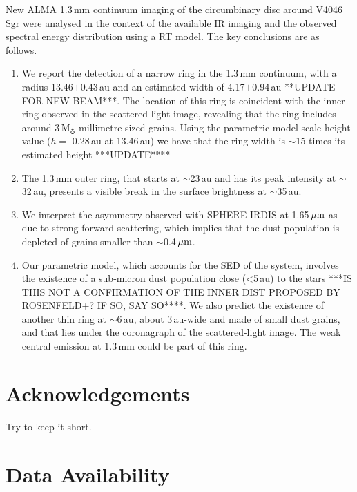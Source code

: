 \documentclass[letters,usenatbib,times]{mnras}
\begin{document}
New ALMA 1.3\,mm continuum imaging of the circumbinary disc around V4046\,Sgr were analysed in the context of the available IR imaging and the observed spectral energy distribution using a RT model.  The key conclusions are as follows.
\begin{enumerate}

\item We report the detection of a narrow ring in the 1.3\,mm continuum, with a  radius 13.46$\pm$0.43\,au and an estimated width of 4.17$\pm$0.94\,au **UPDATE FOR NEW BEAM***. The location of this ring is coincident with the inner ring observed in the scattered-light image, revealing that the ring includes around 3\,M$_{\earth}$ millimetre-sized grains. Using the parametric model scale height value ($h= $ 0.28\,au at 13.46\,au) we have that the ring width is $\sim$15 times its estimated height ***UPDATE****
  
  \item The 1.3\,mm outer ring, that starts at $\sim$23\,au and has its peak intensity at $\sim$32\,au, presents a visible break in the surface brightness at $\sim$35\,au. 
  \item We interpret the asymmetry observed with SPHERE-IRDIS at 1.65\,$\hbox{$\mu$m}$ as due to strong forward-scattering, which implies that the dust population is depleted of grains smaller than $\sim$0.4\,$\hbox{$\mu$m}$.
  
  \item Our parametric model, which accounts for the SED of the system, involves the existence of a sub-micron dust population close (<5\,au) to the stars ***IS THIS NOT A CONFIRMATION OF THE INNER DIST PROPOSED BY ROSENFELD+? IF SO, SAY SO****. We also predict the existence of another thin ring at $\sim$6\,au, about 3\,au-wide and made of small dust grains, and  that lies under the coronagraph of the scattered-light image. The weak central emission at 1.3\,mm could be part of this ring.
\end{enumerate}
  

 \section*{Acknowledgements}

Try to keep it short.
  
\section*{Data Availability}
\end{document}
